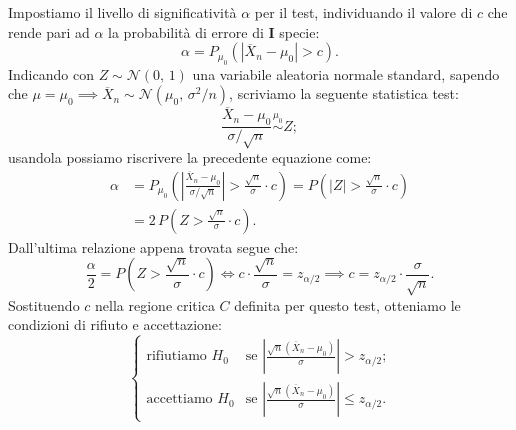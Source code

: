 \begin{defn}[Bilatero]
                Impostiamo il livello di significatività $\alpha$ per il test, individuando il valore di $c$ 
                che rende pari ad $\alpha$ la probabilità di errore di $\mathbf{I}$ specie: \[
                    \alpha = P_{\mu_0}(|\overline{X}_n -\mu_0| > c)
                .\] Indicando con $Z\sim \mathcal{N}(0,\,1)$ una variabile aleatoria normale standard, sapendo 
                che $\mu = \mu_0 \implies \overline{X}_n \sim \mathcal{N}(\mu_0,\,\sigma^2 /n)$, scriviamo 
                la seguente statistica test: \[
                    \frac{\overline{X}_n -\mu_0}{\sigma /\sqrt{n}} \overset{\mu_0}{\sim} Z
                ;\] usandola possiamo riscrivere la precedente equazione come:
                \begin{align*}
                    \alpha &= P_{\mu_0}\left(\left|\frac{\overline{X}_n -\mu_0}{\sigma /\sqrt{n}}\right| 
                    > \frac{\sqrt{n}}{\sigma}\cdot c\right)
                    = P\left(|Z| > \frac{\sqrt{n}}{\sigma}\cdot c\right) \\
                    &= 2\,P\left(Z > \frac{\sqrt{n}}{\sigma}\cdot c\right)
                .\end{align*}
                Dall'ultima relazione appena trovata segue che: \[
                    \frac{\alpha}{2} = P\left(Z > \frac{\sqrt{n}}{\sigma}\cdot c\right)
                    \iff c \cdot\frac{\sqrt{n}}{\sigma} = z_{\alpha /2} \implies 
                    c = z_{\alpha /2}\cdot \frac{\sigma}{\sqrt{n}}
                .\] Sostituendo $c$ nella regione critica $C$ definita per questo test, otteniamo le condizioni 
                di rifiuto e accettazione: \[
                    \begin{cases}
                        \text{rifiutiamo } H_0 & 
                        \text{se $\left|\frac{\sqrt{n}\left(\overline{X}_n -\mu_0\right)}{\sigma}\right| > z_{\alpha /2}$;} \\
                        \text{accettiamo } H_0 & 
                        \text{se $\left|\frac{\sqrt{n}\left(\overline{X}_n -\mu_0\right)}{\sigma}\right| \leq z_{\alpha /2}$.}
                    \end{cases}
                \]
            \end{defn}
